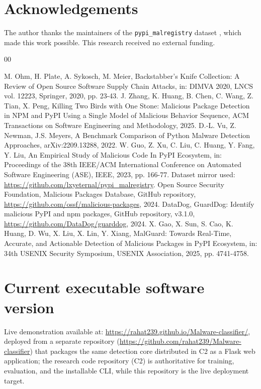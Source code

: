 \documentclass[preprint,12pt, a4paper]{elsarticle}
\begin{document}
\section*{Acknowledgements}
\label{}

The author thanks the maintainers of the \texttt{pypi\_malregistry} dataset \cite{malregistry}, which made this work possible. This research received no external funding.

\begin{thebibliography}{00}

 M. Ohm, H. Plate, A. Sykosch, M. Meier, Backstabber's Knife Collection: A Review of Open Source Software Supply Chain Attacks, in: DIMVA 2020, LNCS vol. 12223, Springer, 2020, pp. 23-43.
 J. Zhang, K. Huang, B. Chen, C. Wang, Z. Tian, X. Peng, Killing Two Birds with One Stone: Malicious Package Detection in NPM and PyPI Using a Single Model of Malicious Behavior Sequence, ACM Transactions on Software Engineering and Methodology, 2025.
 D.-L. Vu, Z. Newman, J.S. Meyers, A Benchmark Comparison of Python Malware Detection Approaches, arXiv:2209.13288, 2022.
 W. Guo, Z. Xu, C. Liu, C. Huang, Y. Fang, Y. Liu, An Empirical Study of Malicious Code In PyPI Ecosystem, in: Proceedings of the 38th IEEE/ACM International Conference on Automated Software Engineering (ASE), IEEE, 2023, pp. 166-77. Dataset mirror used: \url{https://github.com/lxyeternal/pypi_malregistry}.
 Open Source Security Foundation, Malicious Packages Database, GitHub repository, \url{https://github.com/ossf/malicious-packages}, 2024.
 DataDog, GuardDog: Identify malicious PyPI and npm packages, GitHub repository, v3.1.0, \url{https://github.com/DataDog/guarddog}, 2024.
 X. Gao, X. Sun, S. Cao, K. Huang, D. Wu, X. Liu, X. Lin, Y. Xiang, MalGuard: Towards Real-Time, Accurate, and Actionable Detection of Malicious Packages in PyPI Ecosystem, in: 34th USENIX Security Symposium, USENIX Association, 2025, pp. 4741-4758.

\end{thebibliography}

\section*{Current executable software version}
\label{}

Live demonstration available at: \url{https://rahat239.github.io/Malware-classifier/}, deployed from a separate repository (\url{https://github.com/rahat239/Malware-classifier}) that packages the same detection core distributed in C2 as a Flask web application; the research code repository (C2) is authoritative for training, evaluation, and the installable CLI, while this repository is the live deployment target.
\end{document}
